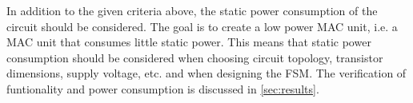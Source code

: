 In addition to the given criteria above, the static power consumption of the circuit should be considered. The goal is to create a low power MAC unit, i.e. a MAC unit that consumes little static power. This means that static power consumption should be considered when choosing circuit topology, transistor dimensions, supply voltage, etc. and when designing the FSM. The verification of funtionality and power consumption is discussed in \autoref{sec:results}.
